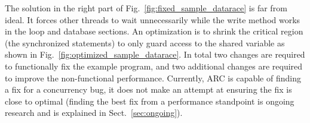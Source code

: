 The solution in the right part of Fig.~\ref{fig:fixed_sample_datarace} is far
from ideal. It forces other threads to wait unnecessarily while the write
method works in the loop and database sections. An optimization is to shrink
the critical region (the synchronized statements) to only guard access to the
shared variable as shown in Fig.~\ref{fig:optimized_sample_datarace}.
In total two changes
are required to functionally fix the example program, and two additional
changes are required to improve the non-functional performance. %
Currently, ARC is capable of finding a fix for a concurrency bug, it does not make an
attempt at ensuring the fix is close to optimal (finding the best fix from a performance standpoint is ongoing research and is explained in Sect.~\ref{sec:ongoing}).

